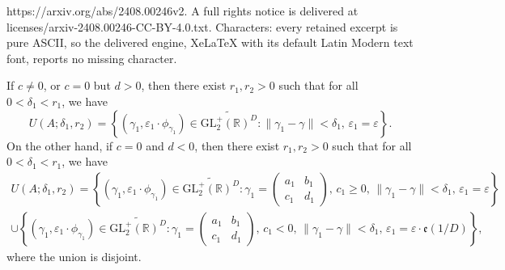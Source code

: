 \documentclass[10pt,a4paper]{amsart}
\newcommand\Dcover[2]{\widetilde{#1^{#2}}}
\newcommand\etp[1]{\mathfrak{e}\left(#1\right)}
\newcommand\glpR{\mathrm{GL}_2^{+}(\mathbb{R})}
\newcommand\tbtmat[4]{\left(\begin{smallmatrix}{#1} & {#2} \\ {#3} & {#4}\end{smallmatrix}\right)}
\begin{document}
https://arxiv.org/abs/2408.00246v2. A full rights notice is delivered at licenses/arxiv-2408.00246-CC-BY-4.0.txt. Characters: every retained excerpt is pure ASCII, so the delivered engine, XeLaTeX with its default Latin Modern text font, reports no missing character.
\begin{lemm}
\label{lemm:neighborhood}
If $c\neq0$, or $c=0$ but $d>0$, then there exist $r_1,r_2>0$ such that for all $0<\delta_1<r_1$, we have
\begin{equation}
\label{eq:smallneighborhood1}
U(A;\delta_1,r_2)=\left\{(\gamma_1,\varepsilon_1\cdot\phi_{\gamma_1})\in\Dcover{\glpR}{D}\colon\lVert\gamma_1-\gamma\rVert<\delta_1,\,\varepsilon_1=\varepsilon\right\}.
\end{equation}
On the other hand, if $c=0$ and $d<0$, then there exist $r_1,r_2>0$ such that for all $0<\delta_1<r_1$, we have
\begin{multline}
\label{eq:smallneighborhood2}
U(A;\delta_1,r_2)=\left\{(\gamma_1,\varepsilon_1\cdot\phi_{\gamma_1})\in\Dcover{\glpR}{D}\colon\gamma_1=\tbtmat{a_1}{b_1}{c_1}{d_1},\,c_1\geq0,\,\lVert\gamma_1-\gamma\rVert<\delta_1,\,\varepsilon_1=\varepsilon\right\}\\
\cup\left\{(\gamma_1,\varepsilon_1\cdot\phi_{\gamma_1})\in\Dcover{\glpR}{D}\colon\gamma_1=\tbtmat{a_1}{b_1}{c_1}{d_1},\,c_1<0,\,\lVert\gamma_1-\gamma\rVert<\delta_1,\,\varepsilon_1=\varepsilon\cdot\etp{1/D}\right\},
\end{multline}
where the union is disjoint.
\end{lemm}
\end{document}
